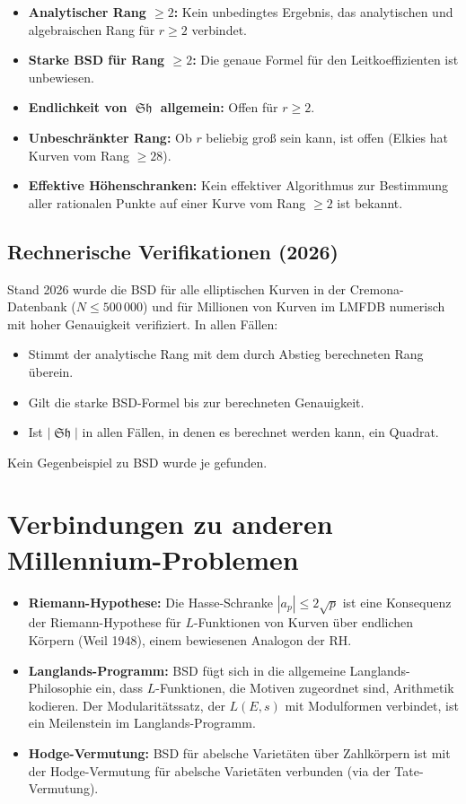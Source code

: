 \documentclass[12pt,a4paper]{article}
\theoremstyle{remark}
\DeclareMathOperator{\Sha}{\mathfrak{Sh}}
\begin{document}
\begin{itemize}[nosep]
  \item \textbf{Analytischer Rang $\geq 2$:} Kein unbedingtes Ergebnis, das analytischen
    und algebraischen Rang für $r \geq 2$ verbindet.
  \item \textbf{Starke BSD für Rang $\geq 2$:} Die genaue Formel für den Leitkoeffizienten
    ist unbewiesen.
  \item \textbf{Endlichkeit von $\Sha$ allgemein:} Offen für $r \geq 2$.
  \item \textbf{Unbeschränkter Rang:} Ob $r$ beliebig groß sein kann, ist offen
    (Elkies hat Kurven vom Rang $\geq 28$).
  \item \textbf{Effektive Höhenschranken:} Kein effektiver Algorithmus zur Bestimmung aller
    rationalen Punkte auf einer Kurve vom Rang $\geq 2$ ist bekannt.
\end{itemize}

\subsection{Rechnerische Verifikationen (2026)}

Stand 2026 wurde die BSD für alle elliptischen Kurven in der Cremona-Datenbank
($N \leq 500\,000$) und für Millionen von Kurven im LMFDB numerisch mit hoher Genauigkeit
verifiziert. In allen Fällen:
\begin{itemize}[nosep]
  \item Stimmt der analytische Rang mit dem durch Abstieg berechneten Rang überein.
  \item Gilt die starke BSD-Formel bis zur berechneten Genauigkeit.
  \item Ist $|\Sha|$ in allen Fällen, in denen es berechnet werden kann, ein Quadrat.
\end{itemize}

Kein Gegenbeispiel zu BSD wurde je gefunden.

\section{Verbindungen zu anderen Millennium-Problemen}

\begin{itemize}[nosep]
  \item \textbf{Riemann-Hypothese:} Die Hasse-Schranke $|a_p| \leq 2\sqrt{p}$ ist eine
    Konsequenz der Riemann-Hypothese für $L$-Funktionen von Kurven über endlichen Körpern
    (Weil 1948), einem bewiesenen Analogon der RH.
  \item \textbf{Langlands-Programm:} BSD fügt sich in die allgemeine Langlands-Philosophie
    ein, dass $L$-Funktionen, die Motiven zugeordnet sind, Arithmetik kodieren. Der
    Modularitätssatz, der $L(E,s)$ mit Modulformen verbindet, ist ein Meilenstein im
    Langlands-Programm.
  \item \textbf{Hodge-Vermutung:} BSD für abelsche Varietäten über Zahlkörpern ist mit der
    Hodge-Vermutung für abelsche Varietäten verbunden (via der Tate-Vermutung).
\end{itemize}
\end{document}
